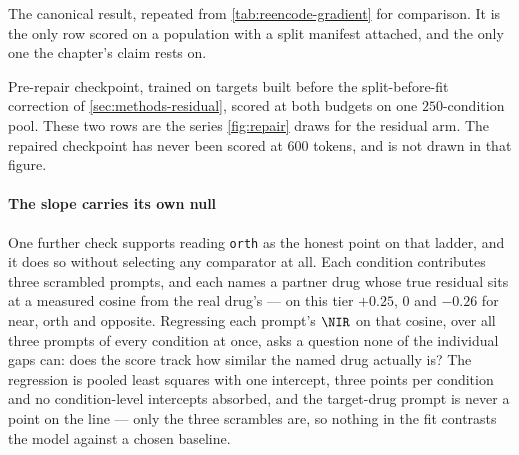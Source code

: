 \begin{table}[htbp]
\begin{fullwidth}
\begin{threeparttable}
  \begin{tablenotes}[flushleft]
  \item[a] The canonical result, repeated from \cref{tab:reencode-gradient} for
  comparison. It is the only row scored on a population with a split manifest
  attached, and the only one the chapter's claim rests on.
  \item[b] Pre-repair checkpoint, trained on targets built before the
  split-before-fit correction of \cref{sec:methods-residual}, scored at both
  budgets on one $\num{250}$-condition pool. These two rows are the series
  \cref{fig:repair} draws for the residual arm. The repaired checkpoint has never
  been scored at $600$ tokens, and is not drawn in that figure.
  \end{tablenotes}
  \end{threeparttable}
  \end{fullwidth}
  \end{table}

  \paragraph{The slope carries its own null}
  One further check supports reading \texttt{orth} as the honest point on that
ladder, and it does so without selecting any comparator at all. Each condition
contributes three scrambled prompts, and each names a partner drug whose true
residual sits at a measured cosine from the real drug's --- on this tier
$+0.25$, $0$ and $-0.26$ for near, orth and opposite.  Regressing each prompt's $\NIR$ on
that cosine, over all three prompts of every condition at once, asks a question
none of the individual gaps can: does the score track how similar the named drug
actually is? The regression is pooled least squares with one intercept, three
points per condition and no condition-level intercepts absorbed, and the
target-drug prompt is never a point on the line --- only the three scrambles
are, so nothing in the fit contrasts the model against a chosen baseline.

